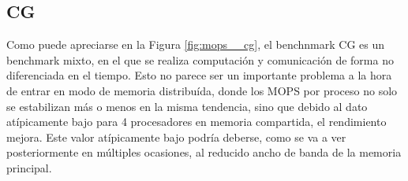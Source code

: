 \subsection{CG}
\label{ssec:comparacion_resultados__cg}

Como puede apreciarse en la Figura \ref{fig:mops__cg}, el benchnmark CG es un benchmark mixto, en el que se realiza computación y comunicación de forma no diferenciada en el tiempo. Esto no parece ser un importante problema a la hora de entrar en modo de memoria distribuída, donde los MOPS por proceso no solo se estabilizan más o menos en la misma tendencia, sino que debido al dato atípicamente bajo para 4 procesadores en memoria compartida, el rendimiento mejora. Este valor atípicamente bajo podría deberse, como se va a ver posteriormente en múltiples ocasiones, al reducido ancho de banda de la memoria principal.

